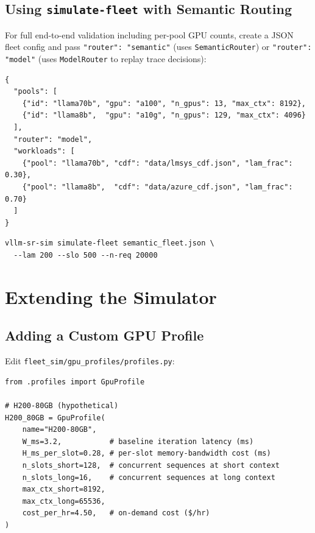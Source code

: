 \documentclass[11pt,a4paper]{article}
\begin{document}
\subsection{Using \texttt{simulate-fleet} with Semantic Routing}

For full end-to-end validation including per-pool GPU counts, create a JSON
fleet config and pass \texttt{"router": "semantic"} (uses
\texttt{SemanticRouter}) or \texttt{"router": "model"} (uses
\texttt{ModelRouter} to replay trace decisions):

\begin{lstlisting}[style=python]
{
  "pools": [
    {"id": "llama70b", "gpu": "a100", "n_gpus": 13, "max_ctx": 8192},
    {"id": "llama8b",  "gpu": "a10g", "n_gpus": 129, "max_ctx": 4096}
  ],
  "router": "model",
  "workloads": [
    {"pool": "llama70b", "cdf": "data/lmsys_cdf.json", "lam_frac": 0.30},
    {"pool": "llama8b",  "cdf": "data/azure_cdf.json", "lam_frac": 0.70}
  ]
}
\end{lstlisting}

\begin{lstlisting}[style=shell]
vllm-sr-sim simulate-fleet semantic_fleet.json \
  --lam 200 --slo 500 --n-req 20000
\end{lstlisting}

\section{Extending the Simulator}
\label{sec:extend}

\subsection{Adding a Custom GPU Profile}

Edit \texttt{fleet\_sim/gpu\_profiles/profiles.py}:

\begin{lstlisting}[style=python]
from .profiles import GpuProfile

# H200-80GB (hypothetical)
H200_80GB = GpuProfile(
    name="H200-80GB",
    W_ms=3.2,           # baseline iteration latency (ms)
    H_ms_per_slot=0.28, # per-slot memory-bandwidth cost (ms)
    n_slots_short=128,  # concurrent sequences at short context
    n_slots_long=16,    # concurrent sequences at long context
    max_ctx_short=8192,
    max_ctx_long=65536,
    cost_per_hr=4.50,   # on-demand cost ($/hr)
)
\end{lstlisting}
\end{document}
